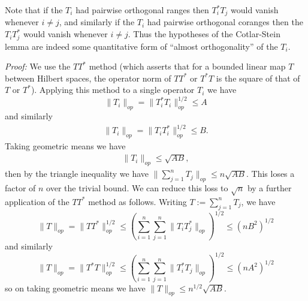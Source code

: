 \documentclass[11pt]{article}
\theoremstyle{definition}
\theoremstyle{remark}
\begin{document}
Note that if the \({T_i}\) had pairwise orthogonal ranges then \({T_i^* T_j}\) would vanish whenever \({i \neq j}\), and similarly if the \({T_i}\) had pairwise orthogonal coranges then the \({T_i T_j^*}\) would vanish whenever \({i \neq j}\). Thus the hypotheses of the Cotlar-Stein lemma are indeed some quantitative form of “almost orthogonality” of the \({T_i}\).


\emph{Proof:}  We use the \({TT^*}\) method (which asserts that for a bounded linear map \({T}\) between Hilbert spaces, the operator norm of \({TT^*}\) or \({T^* T}\) is the square of that of \({T}\) or \({T^*}\)). Applying this method to a single operator \({T_i}\) we have 
\[\displaystyle  \|T_i\|_{op} = \| T_i^* T_i \|_{op}^{1/2} \leq A \]
 and similarly 
\begin{align}\label{opa}
  \|T_i\|_{op} = \| T_i T_i^* \|_{op}^{1/2} \leq B. 
\end{align}
 Taking geometric means we have 
\begin{align}\label{tia}
  \|T_i\|_{op} \leq \sqrt{AB}, 
\end{align}
 then by the triangle inequality we have \({\|\sum_{j=1}^n T_j \|_{op} \leq n \sqrt{AB}}\). This loses a factor of \({n}\) over the trivial bound. We can reduce this loss to \({\sqrt{n}}\) by a further application of the \({TT^*}\) method as follows. Writing \({T := \sum_{j=1}^n T_j}\), we have 
\[\displaystyle  \| T \|_{op} = \| TT^* \|_{op}^{1/2} \leq (\sum_{i=1}^n \sum_{j=1}^n \| T_i T_j^* \|_{op})^{1/2} \leq (nB^2)^{1/2}\]
 and similarly 
\[\displaystyle  \| T \|_{op} = \| T^*T \|_{op}^{1/2} \leq (\sum_{i=1}^n \sum_{j=1}^n \| T_i^* T_j \|_{op})^{1/2} \leq (nA^2)^{1/2}\]
 so on taking geometric means we have \({\|T\|_{op} \leq n^{1/2} \sqrt{AB}}\). 
\end{document}
